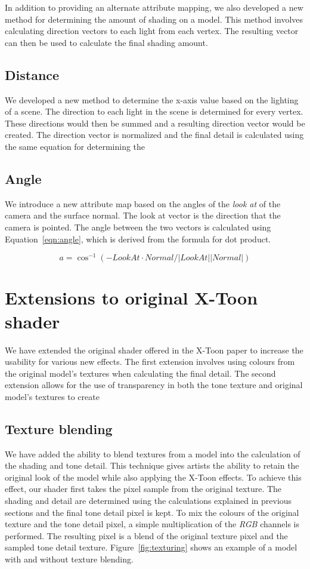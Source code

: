 \documentclass[annual]{acmsiggraph}
\begin{document}
In addition to providing an alternate attribute mapping, we also developed a new method for determining the amount of shading on a model. This method involves calculating direction vectors to each light from each vertex. The resulting vector can then be used to calculate the final shading amount.

\subsection{Distance}
We developed a new method to determine the x-axis value based on the lighting of a scene. The direction to each light in the scene is determined for every vertex. These directions would then be summed and a resulting direction vector would be created. The direction vector is normalized and the final detail is calculated using the same equation for determining the 

\subsection{Angle}
We introduce a new attribute map based on the angles of the {\it{look at}} of the camera and the surface normal. The look at vector is the direction that the camera is pointed. The angle between the two vectors is calculated using Equation~\ref{eqn:angle}, which is derived from the formula for dot product.

\begin{equation}
\label{eqn:angle}
a = \cos^{-1}{(-LookAt \cdot Normal / |LookAt||Normal|)}
\end{equation}

\section{Extensions to original X-Toon shader}
We have extended the original shader offered in the X-Toon paper to increase the usability for various new effects. The first extension involves using colours from the original model's textures when calculating the final detail. The second extension allows for the use of transparency in both the tone texture and original model's textures to create 

\subsection{Texture blending}
We have added the ability to blend textures from a model into the calculation of the shading and tone detail. This technique gives artists the ability to retain the original look of the model while also applying the X-Toon effects. To achieve this effect, our shader first takes the pixel sample from the original texture. The shading and detail are determined using the calculations explained in previous sections and the final tone detail pixel is kept. To mix the colours of the original texture and the tone detail pixel, a simple multiplication of the {\it{RGB}} channels is performed. The resulting pixel is a blend of the original texture pixel and the sampled tone detail texture. Figure~\ref{fig:texturing} shows an example of a model with and without texture blending.
\end{document}
